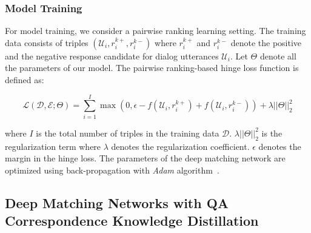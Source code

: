 \subsubsection{\textbf{Model Training}}
For model training, we consider a pairwise ranking learning setting. The training data consists of triples $(\mathcal{U}_i, r_i^{k+}, r_i^{k-})$ where $r_i^{k+}$ and $r_i^{k-}$ denote the positive and the  negative response candidate  for dialog utterances $\mathcal{U}_i$. Let $\Theta$ denote all the parameters of our model. The pairwise ranking-based hinge loss function is defined as:
 \begin{footnotesize}
\begin{equation}
\mathcal{L}(\mathcal{D}, \mathcal{E};\Theta) = \sum_{i=1}^{I} \max(0, \epsilon - f( \mathcal{U}_i, r_i^{k+} )  +  f( \mathcal{U}_i, r_i^{k-} )  ) + \lambda ||\Theta||^2_2
\end{equation}
\end{footnotesize}
where $I$ is the total number of triples in the training data $\mathcal{D}$. $\lambda ||\Theta||^2_2$ is the regularization term where $\lambda$  denotes the regularization coefficient. $\epsilon$ denotes the margin in the hinge loss. The parameters of the deep matching network are optimized using back-propagation with \textit{Adam} algorithm~\cite{DBLP:journals/corr/KingmaB14}.  %

\subsection{Deep Matching Networks with QA Correspondence Knowledge Distillation}
\label{sec:method_dmn_kd}

